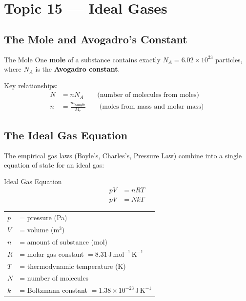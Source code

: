 \section{Topic 15 — Ideal Gases}

\subsection{The Mole and Avogadro's Constant}

\begin{defnbox}{The Mole}
One \textbf{mole} of a substance contains exactly $N_A = 6.02 \times 10^{23}$
particles, where $N_A$ is the \textbf{Avogadro constant}.
\end{defnbox}

Key relationships:
\begin{align}
  N &= nN_A \qquad \text{(number of molecules from moles)} \\
  n &= \frac{m_{\text{sample}}}{M_r} \qquad \text{(moles from mass and molar mass)}
\end{align}

\subsection{The Ideal Gas Equation}

The empirical gas laws (Boyle's, Charles's, Pressure Law) combine into a single
equation of state for an ideal gas:

\begin{formulabox}{Ideal Gas Equation}
\begin{align}
  pV &= nRT \\[4pt]
  pV &= NkT
\end{align}
\begin{tabular}{ll}
$p$ & = pressure (Pa) \\
$V$ & = volume (m$^3$) \\
$n$ & = amount of substance (mol) \\
$R$ & = molar gas constant $= 8.31\,\mathrm{J\,mol^{-1}\,K^{-1}}$ \\
$T$ & = thermodynamic temperature (K) \\
$N$ & = number of molecules \\
$k$ & = Boltzmann constant $= 1.38 \times 10^{-23}\,\mathrm{J\,K^{-1}}$ \\
\end{tabular}
\end{formulabox}

